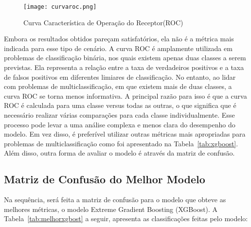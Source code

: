 \documentclass[12pt,oneside,a4paper,chapter=TITLE,
			   english,brazil]{abntex2}
\begin{document}
\begin{figure}[H]
  \centering
   \caption[Curva Característica de Operação do Receptor(ROC)]{Curva Característica de Operação do Receptor(ROC)} 
  \texttt{[image: curvaroc.png]}
  \label{fig:Roc}
  \end{figure}
 \begin{flushleft}
\vspace{-1.0em}
\centering
{}
\end{flushleft}

  Embora os resultados obtidos pareçam satisfatórios, ela não é a métrica mais indicada para esse tipo de cenário. A curva ROC é amplamente utilizada em problemas de classificação binária, nos quais existem apenas duas classes a serem previstas. Ela representa a relação entre a taxa de verdadeiros positivos e a taxa de falsos positivos em diferentes limiares de classificação.  No entanto, ao lidar com problemas de multiclassificação, em que existem mais de duas classes, a curva ROC se torna menos informativa. A principal razão para isso é que a curva ROC é calculada para uma classe versus todas as outras, o que significa que é necessário realizar várias comparações para cada classe individualmente. Esse processo pode levar a uma análise complexa e menos clara do desempenho do modelo. Em vez disso, é preferível utilizar outras métricas mais apropriadas para problemas de multiclassificação como  foi apresentado na Tabela~\ref{tab:xgboost}. Além disso, outra forma de avaliar o modelo  é através    da matriz  de confusão.



\vspace{\onelineskip}
\subsection{Matriz de Confusão do Melhor Modelo}
\vspace{\onelineskip}

Na sequência, será feita a matriz de confusão para o modelo que obteve as melhores métricas, o modelo Extreme Gradient Boosting (XGBoost). A Tabela~\ref{tab:melhorxgbost} a seguir, apresenta as classificações feitas pelo modelo:
\end{document}

